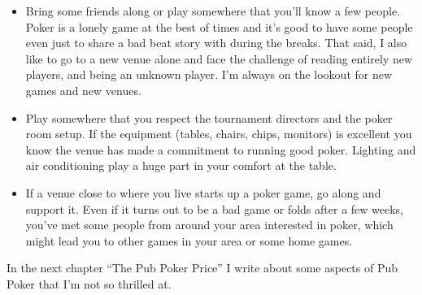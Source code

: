 \begin{itemize}
\item Bring some friends along or play somewhere that you'll
know a few people. Poker is a lonely game at the best
of times and it's good to have some people even just to share
a bad beat story with during the breaks. That said, I also like
to go to a new venue alone and face the challenge of
reading entirely new players, and being an unknown player.
I'm always on the lookout for new games and new venues.

\item Play somewhere that you respect the tournament directors
and the poker room setup. If the equipment (tables, chairs, chips,
monitors) is excellent you know the venue has made a commitment
to running good poker. Lighting and air conditioning
play a huge part in your comfort at the table.

\item If a venue close to where you live starts
up a poker game, go along and support it. Even if it turns out to
be a bad game or folds after a few weeks, you've met some people
from around your area interested in poker, which might lead
you to other games in your area or some home games.

\end{itemize}

In the next chapter ``The Pub Poker Price'' I write about some
aspects of Pub Poker that I'm not so thrilled at.
